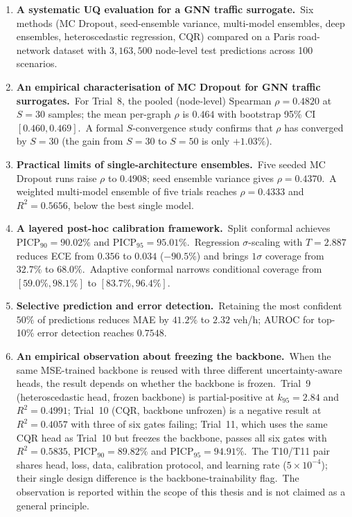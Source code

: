 \begin{enumerate}
 \item \textbf{A systematic UQ evaluation for a GNN traffic surrogate.}\ Six methods (MC Dropout, seed-ensemble variance, multi-model ensembles, deep ensembles, heteroscedastic regression, CQR) compared on a Paris road-network dataset with $3{,}163{,}500$ node-level test predictions across 100 scenarios.

 \item \textbf{An empirical characterisation of MC Dropout for GNN traffic surrogates.}\ For Trial~8, the pooled (node-level) Spearman $\rho = 0.4820$ at $S = 30$ samples; the mean per-graph $\rho$ is $0.464$ with bootstrap 95\% CI $[0.460, 0.469]$.\ A formal $S$-convergence study confirms that $\rho$ has converged by $S = 30$ (the gain from $S = 30$ to $S = 50$ is only $+1.03\%$).

 \item \textbf{Practical limits of single-architecture ensembles.}\ Five seeded MC Dropout runs raise $\rho$ to $0.4908$; seed ensemble variance gives $\rho = 0.4370$.\ A weighted multi-model ensemble of five trials reaches $\rho = 0.4333$ and $R^2 = 0.5656$, below the best single model.

 \item \textbf{A layered post-hoc calibration framework.}\ Split conformal achieves $\mathrm{PICP}_{90} = 90.02\%$ and $\mathrm{PICP}_{95} = 95.01\%$.\ Regression $\sigma$-scaling with $T = 2.887$ reduces ECE from $0.356$ to $0.034$ ($-90.5\%$) and brings $1\sigma$ coverage from $32.7\%$ to $68.0\%$.\ Adaptive conformal narrows conditional coverage from $[59.0\%, 98.1\%]$ to $[83.7\%, 96.4\%]$.

 \item \textbf{Selective prediction and error detection.}\ Retaining the most confident $50\%$ of predictions reduces MAE by $41.2\%$ to $2.32$ veh/h; AUROC for top-10\% error detection reaches $0.7548$.

 \item \textbf{An empirical observation about freezing the backbone.}\ When the same MSE-trained backbone is reused with three different uncertainty-aware heads, the result depends on whether the backbone is frozen.\ Trial~9 (heteroscedastic head, frozen backbone) is partial-positive at $k_{95} = 2.84$ and $R^2 = 0.4991$; Trial~10 (CQR, backbone unfrozen) is a negative result at $R^2 = 0.4057$ with three of six gates failing; Trial~11, which uses the same CQR head as Trial~10 but freezes the backbone, passes all six gates with $R^2 = 0.5835$, $\mathrm{PICP}_{90} = 89.82\%$ and $\mathrm{PICP}_{95} = 94.91\%$.\ The T10/T11 pair shares head, loss, data, calibration protocol, and learning rate ($5\times10^{-4}$); their single design difference is the backbone-trainability flag.\ The observation is reported within the scope of this thesis and is not claimed as a general principle.


\end{enumerate}
